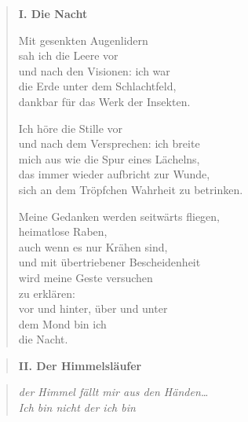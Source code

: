 
\cleartoverso



\begin{verse}

{\bfseries I. Die Nacht}

Mit gesenkten Augenlidern\\
sah ich die Leere vor\\
und nach den Visionen: ich war\\
die Erde unter dem Schlachtfeld,\\
dankbar für das Werk der Insekten.

Ich höre die Stille vor\\
und nach dem Versprechen: ich breite\\
mich aus wie die Spur eines Lächelns,\\
das immer wieder aufbricht zur Wunde,\\
sich an dem Tröpfchen Wahrheit zu betrinken.

Meine Gedanken werden seitwärts fliegen,\\
heimatlose Raben,\\
auch wenn es nur Krähen sind,\\
und mit übertriebener Bescheidenheit\\
wird meine Geste versuchen\\
zu erklären:\\
vor und hinter, über und unter\\
dem Mond bin ich\\
die Nacht.
\end{verse}

\clearpage

\begin{verse}
{\bfseries II. Der Himmelsläufer}
\end{verse}

\begin{quote}
\itshape\smaller
der Himmel fällt mir aus den Händen\ldots\\
Ich bin nicht der ich bin

\end{quote}

